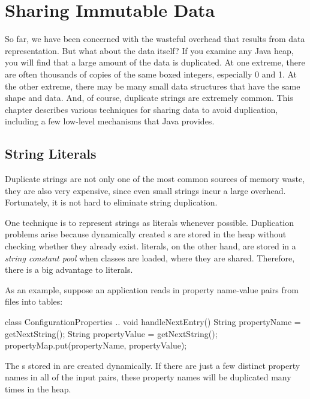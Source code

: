 \chapter{Sharing Immutable Data}

So far, we have been concerned with the wasteful overhead that results from
data representation. But what about the data itself? If you examine any Java
heap, you will find that a
large amount of the data is duplicated. At one extreme, 
there are often thousands of copies of the same boxed
integers, especially 0 and 1. At the other extreme, there may be many
 small data
structures that have the same shape and data. 
And, of course, duplicate strings are extremely common.
This chapter describes various
techniques for sharing data to avoid
duplication, including a few low-level mechanisms that Java provides.

\section{String Literals}
\label{sec:literals}

Duplicate strings are not only one of the
most common sources of memory waste, they are also very expensive, since even
small strings incur a large overhead. Fortunately, it is not
hard to eliminate string duplication. 

 One technique is to represent strings as  
literals whenever possible. Duplication problems arise because dynamically
 created s
are stored in the heap without checking whether they already
exist.  literals, on the other hand, are stored in a
\emph{string constant pool} when classes
are loaded, where they are shared. Therefore, there is a big advantage to
 literals.

 As an example, suppose an application
reads in property name-value pairs from files into tables:
\begin{shortlisting}
class ConfigurationProperties {
    ..
	void handleNextEntry() {
		String propertyName = getNextString();
		String propertyValue = getNextString();
		propertyMap.put(propertyName, propertyValue);
	}
}
\end{shortlisting}
The s stored in  are created dynamically. If 
there are just a few distinct property names in all of the input pairs, these
property names will be duplicated many times in the heap.

